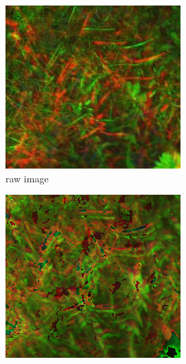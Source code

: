 \documentclass[../thesis.tex]{subfiles}
\begin{document}
	\begin{figure}[ht]
		\centering
		
		\begin{subfigure}[b]{0.23\textwidth}
			\centering
			\includegraphics[width=\linewidth]{img/registration/results-uncorrected}
			\caption{raw image}
			\label{fig:merged-correction-uncorrected}
		\end{subfigure}
		\begin{subfigure}[b]{0.23\textwidth}
			\centering
			\includegraphics[width=\linewidth]{img/registration/results-manufacturer}

\end{subfigure}
\end{figure}
\end{document}
